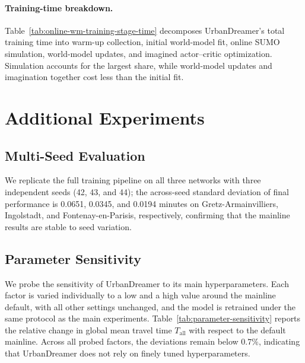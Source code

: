 \paragraph{Training-time breakdown.}  Table~\ref{tab:online-wm-training-stage-time}
decomposes UrbanDreamer's total training time into warm-up collection, initial
world-model fit, online SUMO simulation, world-model updates, and imagined
actor--critic optimization.  Simulation accounts for the largest share, while
world-model updates and imagination together cost less than the initial fit.






\section{Additional Experiments}
\label{app:additional-experiments}

\subsection{Multi-Seed Evaluation}
\label{app:multi-seed}

We replicate the full training pipeline on all three networks with three
independent seeds (42, 43, and 44); the across-seed standard deviation of
final performance is 0.0651, 0.0345, and 0.0194 minutes on
Gretz-Armainvilliers, Ingolstadt, and Fontenay-en-Parisis, respectively,
confirming that the mainline results are stable to seed variation.

\subsection{Parameter Sensitivity}
\label{app:parameter-sensitivity}

We probe the sensitivity of UrbanDreamer to its main hyperparameters.  Each
factor is varied individually to a low and a high value around the mainline
default, with all other settings unchanged, and the model is retrained under
the same protocol as the main experiments.
Table~\ref{tab:parameter-sensitivity} reports the relative change in global
mean travel time \(T_{\mathrm{all}}\) with respect to the default mainline.
Across all probed factors, the deviations remain below \(0.7\%\), indicating
that UrbanDreamer does not rely on finely tuned hyperparameters.

